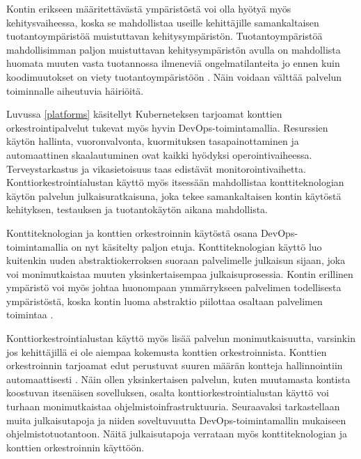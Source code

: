 Kontin erikseen määritettävästä ympäristöstä voi olla hyötyä myös kehitysvaiheessa, koska se mahdollistaa useille kehittäjille samankaltaisen tuotantoympäristöä muistuttavan kehitysympäristön.
Tuotantoympäristöä mahdollisimman paljon muistuttavan kehitysympäristön avulla on mahdollista huomata muuten vasta tuotannossa ilmeneviä ongelmatilanteita jo ennen kuin koodimuutokset on viety tuotantoympäristöön \cite{Narasimhulu23}.
Näin voidaan välttää palvelun toiminnalle aiheutuvia häiriöitä.

Luvussa \ref{platforms} käsitellyt Kuberneteksen tarjoamat konttien orkestrointipalvelut tukevat myös hyvin DevOps-toimintamallia.
Resurssien käytön hallinta, vuoronvalvonta, kuormituksen tasapainottaminen ja automaattinen skaalautuminen ovat kaikki hyödyksi operointivaiheessa.
Terveystarkastus ja vikasietoisuus taas edistävät monitorointivaihetta.
Konttiorkestrointialustan käyttö myös itsessään mahdollistaa konttiteknologian käytön palvelun julkaisuratkaisuna, joka tekee samankaltaisen kontin käytöstä kehityksen, testauksen ja tuotantokäytön aikana mahdollista.

Konttiteknologian ja konttien orkestroinnin käytöstä osana DevOps-toimintamallia on nyt käsitelty paljon etuja.
Konttiteknologian käyttö luo kuitenkin uuden abstraktiokerroksen suoraan palvelimelle julkaisun sijaan, joka voi monimutkaistaa muuten yksinkertaisempaa julkaisuprosessia.
Kontin erillinen ympäristö voi myös johtaa huonompaan ymmärrykseen palvelimen todellisesta ympäristöstä, koska kontin luoma abstraktio piilottaa osaltaan palvelimen toimintaa \cite{Mikkonen22}.

Konttiorkestrointialustan käyttö myös lisää palvelun monimutkaisuutta, varsinkin jos kehittäjillä ei ole aiempaa kokemusta konttien orkestroinnista.
Konttien orkestroinnin tarjoamat edut perustuvat suuren määrän kontteja hallinnointiin automaattisesti \cite{Khan17}.
Näin ollen yksinkertaisen palvelun, kuten muutamasta kontista koostuvan itsenäisen sovelluksen, osalta konttiorkestrointialustan käyttö voi turhaan monimutkaistaa ohjelmistoinfrastruktuuria.
Seuraavaksi tarkastellaan muita julkaisutapoja ja niiden soveltuvuutta DevOps-toimintamallin mukaiseen ohjelmistotuotantoon.
Näitä julkaisutapoja verrataan myös konttiteknologian ja konttien orkestroinnin käyttöön.
